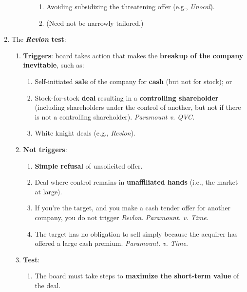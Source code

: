 \begin{enumerate}
\begin{enumerate}
\begin{enumerate}
\begin{enumerate}
                \item Avoiding subsidizing the threatening offer (e.g., 
                \emph{Unocal}).
                \item (Need not be narrowly tailored.)
            \end{enumerate}
        \end{enumerate}
    \end{enumerate}
    \item The \textbf{\emph{Revlon} test}:
    \begin{enumerate}
        \item \textbf{Triggers}: board takes action that makes the 
        \textbf{breakup of the company inevitable}, such as:
        \begin{enumerate}
            \item Self-initiated \textbf{sale} of the company for 
            \textbf{cash} (but not for stock); or
            \item Stock-for-stock \textbf{deal} resulting in a 
            \textbf{controlling shareholder} (including shareholders under the 
            control of another, but not if there is not a controlling 
            shareholder). \emph{Paramount v. QVC.}
            \item White knight deals (e.g., \emph{Revlon}).
        \end{enumerate}
        \item \textbf{Not triggers}:
        \begin{enumerate}
            \item \textbf{Simple refusal} of unsolicited offer.
            \item Deal where control remains in \textbf{unaffiliated hands} 
            (i.e., the market at large).
            \item If you're the target, and you make a cash tender offer for 
            another company, you do not trigger \emph{Revlon}. 
            \emph{Paramount. v. Time}.
            \item The target has no obligation to sell simply because the 
            acquirer has offered a large cash premium. \emph{Paramount. v. Time}.
        \end{enumerate}
        \item \textbf{Test}:
        \begin{enumerate}
            \item The board must take steps to \textbf{maximize the short-term 
            value} of the deal.
        \end{enumerate}
    \end{enumerate}
\end{enumerate}

